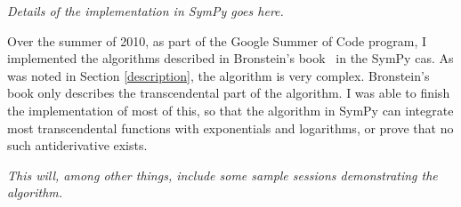 \emph{Details of the implementation in SymPy goes here.}

Over the summer of 2010, as part of the Goo\-gle Summer of Code program, I
implemented the algorithms described in Bronstein's
book~\cite{bronstein2005symbolic} in the SymPy \gls{cas}.  As was noted
in Section \ref{description}, the algorithm is very complex. 
Bronstein's book only describes the
transcendental%
part of the algorithm. I was able to finish the implementation of most
of this, so that the algorithm in SymPy can integrate most
transcendental functions with exponentials and logarithms, %
or prove that no such antiderivative exists.  

\emph{This will, among other things, include some sample sessions
demonstrating the algorithm.}

